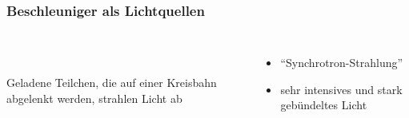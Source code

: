 \documentclass[10pt,t]{beamer}
\begin{document}
\begin{frame}
\frametitle{Beschleuniger als Lichtquellen}
\vspace*{-2.2\baselineskip}
\begin{columns}
~\\[-\baselineskip]
~\\ Geladene Teilchen, die auf einer Kreisbahn abgelenkt werden, strahlen Licht ab
\begin{itemize}
    \item ``Synchrotron-Strahlung''
    \item sehr intensives und stark gebündeltes Licht
\end{itemize}
\end{columns}
\vspace*{-7pt}
\end{frame}
\end{document}
